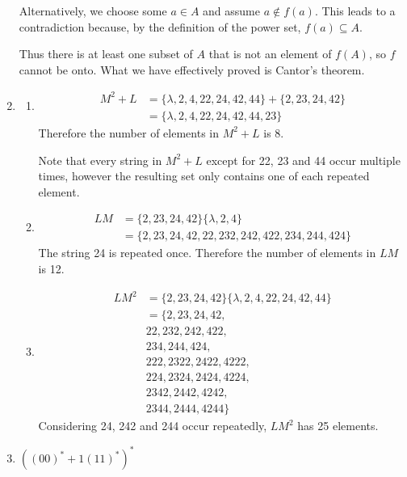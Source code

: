 \documentclass[a4paper]{article}
\begin{document}
\begin{enumerate}
		Alternatively, we choose some $a \in A$ and assume $a \notin f(a)$. This leads to a contradiction because, by the definition of the power set, $f(a) \subseteq A$.
		
		Thus there is at least one subset of $A$ that is not an element of $f(A)$, so $f$ cannot be onto. What we have effectively proved is Cantor's theorem.
		
		\item
		\begin{enumerate}
			\item
			\begin{align*}
				M^2 + L &= \{ \lambda, 2, 4, 22, 24, 42, 44 \} + \{ 2, 23, 24, 42 \} \\
						&= \{ \lambda, 2, 4, 22, 24, 42, 44, 23 \}
			\end{align*}
			Therefore the number of elements in $M^2 + L$ is 8.
			
			Note that every string in $M^2 + L$ except for 22, 23 and 44 occur multiple times, however the resulting set only contains one of each repeated element.
			
			\item
			\begin{align*}
				LM &= \{ 2, 23, 24, 42 \} \{ \lambda, 2, 4 \} \\
				   &= \{ 2, 23, 24, 42, 22, 232, 242, 422, 234, 244, 424 \}	
			\end{align*}
			The string 24 is repeated once. Therefore the number of elements in $LM$ is 12.
			
			\item
			\begin{align*}
				LM^2 &= \{ 2, 23, 24, 42 \} \{ \lambda, 2, 4, 22, 24, 42, 44 \} \\
					 &= \{ 2, 23, 24, 42, \\
					 & 22, 232, 242, 422, \\
					 & 234, 244, 424, \\
					 & 222, 2322, 2422, 4222, \\
					 & 224, 2324, 2424, 4224, \\
					 & 2342, 2442, 4242, \\
					 & 2344, 2444, 4244 \}
			\end{align*}
			Considering 24, 242 and 244 occur repeatedly, $LM^2$ has 25 elements.
		\end{enumerate}
		
		\item $((00)^* + 1(11)^*)^*$
		

\end{enumerate}
\end{document}
